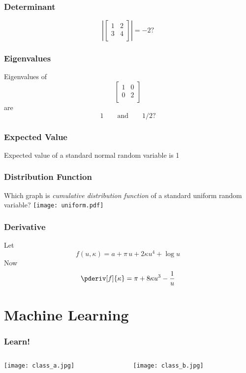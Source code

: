 \documentclass[mathserif, xcolor=table, svgnames]{beamer}
\begin{document}
\begin{frame}
  \frametitle{Determinant}
  \begin{equation*}
    \left|
    \begin{bmatrix}
      1 & 2 \\
      3 & 4 \\
    \end{bmatrix}
    \right|
    = -2?
  \end{equation*}
\end{frame}

\begin{frame}
  \frametitle{Eigenvalues}
  Eigenvalues of
  \begin{equation*}
    \begin{bmatrix}
      1 & 0 \\
      0 & 2 \\
    \end{bmatrix}
  \end{equation*}
  are
  \begin{equation*}
    1 \qquad\text{and}\qquad 1/2?
  \end{equation*}
\end{frame}

\begin{frame}
  \frametitle{Expected Value}
  Expected value of a standard normal random variable is 1
\end{frame}

\begin{frame}
  \frametitle{Distribution Function}
  Which graph is \emph{cumulative distribution function} of a standard
  uniform random variable?
  \texttt{[image: uniform.pdf]}
\end{frame}

\begin{frame}
  \frametitle{Derivative}
  Let
  \begin{equation*}
    f(u, \kappa) = a + \pi\, u + 2\kappa u^{4} + \log u
  \end{equation*}
  Now
  \begin{equation*}
    \pderiv[f]{\kappa} = \pi + 8\kappa u^{3} - \frac{1}{u}
  \end{equation*}
\end{frame}


\section[ML]{Machine Learning}

\begin{frame}
  \frametitle{Learn!}
  \begin{columns}
    \begin{column}{0.5\linewidth}
      \texttt{[image: class\_a.jpg]}
    \end{column}
    \begin{column}{0.5\linewidth}
      \texttt{[image: class\_b.jpg]}
    \end{column}
  \end{columns}
\end{frame}
\end{document}
